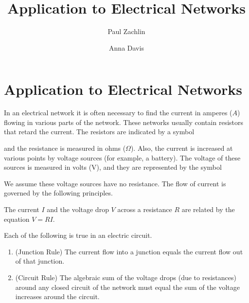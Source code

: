 \documentclass{ximera}
\author{Paul Zachlin \and Anna Davis} \title{Application to Electrical Networks} \license{CC-BY 4.0}
\begin{document}
\begin{abstract}
\end{abstract}
\maketitle

\section*{Application to Electrical Networks}
In an electrical network it is often necessary to find the current in amperes ($A$) flowing in various parts of the network. These networks usually contain resistors that retard the current. The resistors are indicated by a symbol 


\begin{center}

\end{center}


and the resistance is measured in ohms ($\Omega$). Also, the current is increased at various points by voltage sources (for example, a battery). The voltage of these sources is measured in volts (V), and they are represented by the symbol 

We assume these voltage sources have no resistance. The flow of current is governed by the following principles.

\begin{theorem}\label{001806}

The current $I$ and the voltage drop $V$ across a resistance $R$ are related by the equation $V = RI$.

\end{theorem}

\begin{theorem}\label{001809}
    Each of the following is true in an electric circuit.
\begin{enumerate}
    \item\label{item:001809j}(Junction Rule) The current flow into a junction equals the current flow out of that junction.
    \item\label{item:001809c}(Circuit Rule) The algebraic sum of the voltage drops (due to resistances) around any closed circuit of the network must equal the sum of the voltage increases around the circuit.
\end{enumerate}

\end{theorem}
\end{document}
